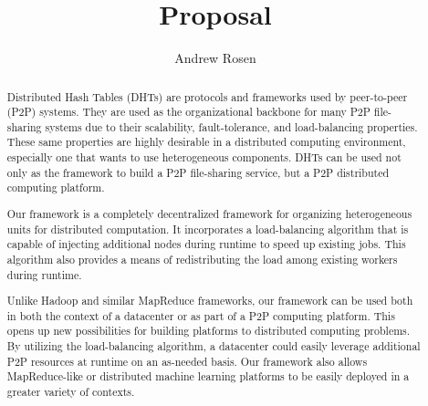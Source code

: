 \documentclass[10pt,letterpaper,twoside]{report}
\title{Proposal}
\author{Andrew Rosen}
\begin{document}
\maketitle
\setcounter{tocdepth}{4}
\tableofcontents
\newpage

\begin{abstract}
Distributed Hash Tables (DHTs) are protocols and frameworks used by peer-to-peer (P2P) systems.
They are used as the organizational backbone for many P2P file-sharing systems due to their scalability, fault-tolerance, and load-balancing properties.
These same properties are highly desirable in a distributed computing environment, especially one that wants to use heterogeneous components.
DHTs can be used not only as the framework to build a P2P file-sharing service, but a P2P distributed computing platform.

Our framework is a completely decentralized framework for organizing heterogeneous units for distributed computation.
It incorporates a load-balancing algorithm that is capable of injecting additional nodes during runtime to speed up existing jobs.
This algorithm also provides a means of redistributing the load among existing workers during runtime.

Unlike Hadoop and similar MapReduce frameworks, our framework can be used both in both the context of a datacenter or as part of a P2P computing platform.  
This opens up new possibilities for building platforms to distributed computing problems.
By utilizing the load-balancing algorithm, a datacenter could easily leverage additional P2P resources at runtime on an as-needed basis.
Our framework also allows MapReduce-like or distributed machine learning platforms to be easily deployed in a greater variety of contexts.

\end{abstract}





%



\end{document}
